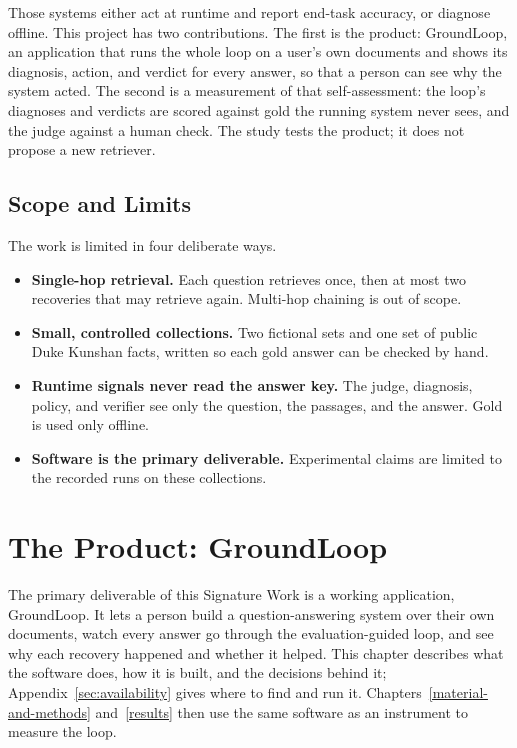 \documentclass[12pt, a4paper, oneside]{report}
\begin{document}
Those systems either act at runtime and report end-task accuracy, or
diagnose offline. This project has two contributions. The first is the
product: GroundLoop, an application that runs the whole loop on a user's
own documents and shows its diagnosis, action, and verdict for every
answer, so that a person can see why the system acted. The second is a
measurement of that self-assessment: the loop's diagnoses and verdicts are
scored against gold the running system never sees, and the judge against a
human check. The study tests the product; it does not propose a new
retriever.

\section{Scope and Limits}

The work is limited in four deliberate ways.

\begin{itemize}
\item \textbf{Single-hop retrieval.} Each question retrieves once, then
  at most two recoveries that may retrieve again. Multi-hop chaining is
  out of scope.
\item \textbf{Small, controlled collections.} Two fictional sets and one
  set of public Duke Kunshan facts, written so each gold answer can be
  checked by hand.
\item \textbf{Runtime signals never read the answer key.} The judge,
  diagnosis, policy, and verifier see only the question, the passages,
  and the answer. Gold is used only offline.
\item \textbf{Software is the primary deliverable.} Experimental claims
  are limited to the recorded runs on these collections.
\end{itemize}


\chapter{The Product: GroundLoop}
\label{product}

The primary deliverable of this Signature Work is a working application,
GroundLoop. It lets a person build a question-answering system over their
own documents, watch every answer go through the evaluation-guided loop,
and see why each recovery happened and whether it helped. This chapter
describes what the software does, how it is built, and the decisions behind
it; Appendix~\ref{sec:availability} gives where to find and run it. Chapters~\ref{material-and-methods} and~\ref{results} then use the same
software as an instrument to measure the loop.
\end{document}
